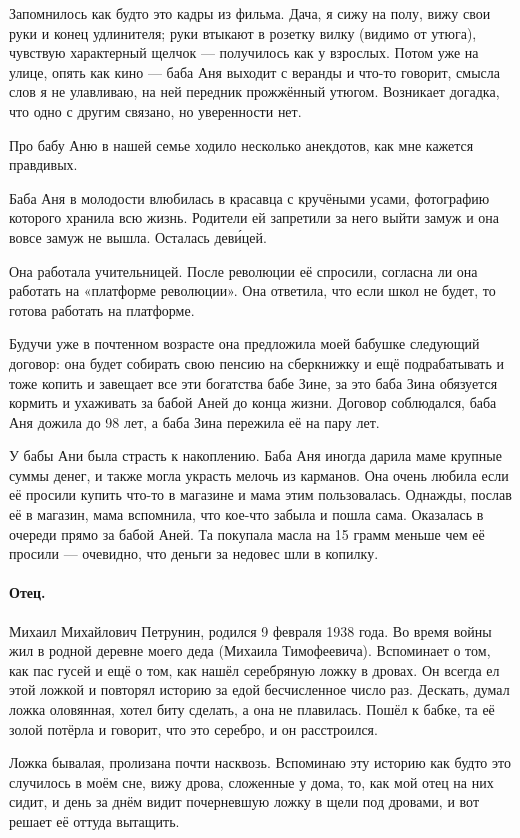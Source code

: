 \documentclass{book}
\begin{document}
Запомнилось как будто это кадры из фильма.
Дача, я сижу на полу, вижу свои руки и конец удлинителя;
руки втыкают в розетку вилку (видимо от утюга), чувствую характерный щелчок --- получилось как у взрослых.
Потом уже на улице, опять как кино --- баба Аня выходит с веранды и что-то говорит, смысла слов я не улавливаю, на ней передник прожжённый утюгом.
Возникает догадка, что одно с другим связано, но уверенности нет.

Про бабу Аню в нашей семье ходило несколько анекдотов, как мне кажется правдивых.

Баба Аня в молодости влюбилась в красавца с кручёными усами, фотографию которого хранила всю жизнь.
Родители ей запретили за него выйти замуж и она вовсе замуж не вышла.
Осталась дев\'{и}цей.

Она работала учительницей.
После революции её спросили, согласна ли она работать на «платформе революции».
Она ответила, что если школ не будет, то готова работать на платформе.

Будучи уже в почтенном возрасте она предложила моей бабушке следующий договор: она будет собирать свою пенсию на сберкнижку и ещё подрабатывать и тоже копить и завещает все эти богатства бабе Зине, за это баба Зина обязуется кормить и ухаживать за бабой Аней до конца жизни.
Договор соблюдался, баба Аня дожила до 98 лет, а баба Зина пережила её на пару лет.

У бабы Ани была страсть к накоплению.
Баба Аня иногда дарила маме крупные суммы денег, и также могла украсть мелочь из карманов.
Она очень любила если её просили купить что-то в магазине и мама этим пользовалась.
Однажды, послав её в магазин, мама вспомнила, что кое-что забыла и пошла сама.
Оказалась в очереди прямо за бабой Аней.
Та покупала масла на 15 грамм меньше чем её просили — очевидно, что деньги за недовес шли в копилку.

\paragraph{Отец.}  Михаил Михайлович Петрунин, родился 9 февраля 1938 года.
Во время войны жил в родной деревне моего деда (Михаила Тимофеевича).
Вспоминает о том, как пас гусей и ещё о том, как нашёл серебряную ложку в дровах.
Он всегда ел этой ложкой и повторял историю за едой бесчисленное число раз.
Дескать, думал ложка оловянная, хотел биту сделать, а она не плавилась.
Пошёл к бабке, та её золой потёрла и говорит, что это серебро, и он расстроился.

Ложка бывалая, пролизана почти насквозь.
Вспоминаю эту историю как будто это случилось в моём сне, вижу дрова, сложенные у дома, то, как мой отец на них сидит, и день за днём видит почерневшую ложку в щели под дровами, и вот решает её оттуда вытащить.
\end{document}

